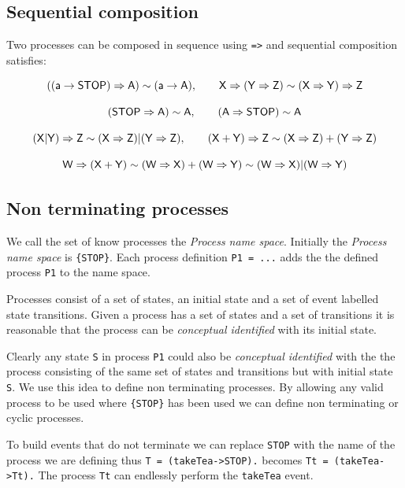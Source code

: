 \documentclass[]{article}
\begin{document}
\subsection{Sequential composition}

Two processes can be composed in sequence using \verb|=>|   and sequential composition satisfies:

\[\sf ((a->STOP)=>A) \sim (a->A),\qquad
X=>(Y=>Z) \sim (X=>Y)=>Z\]

\[\sf (STOP=>A) \sim A, \qquad (A=>STOP) \sim A \]

\[\sf (X|Y)=>Z \sim (X=>Z)| (Y=>Z), \qquad 
(X+Y)=>Z \sim (X=>Z)+ (Y=>Z)\] 

\[\sf W=>(X+Y) \sim (W=>X)+ (W=>Y) \sim (W=>X)| (W=>Y)\]





\subsection{Non terminating processes}
We call the set of know  processes  the  \emph{Process name space}.   Initially the  \emph{Process name space} is \verb${STOP}$.    Each process definition \verb$P1 = ...$ adds the the defined process \verb$P1$ to the name space.

Processes consist of a set of states, an initial state  and a set of event labelled state transitions. Given  a process has a set of states and a set of transitions it is reasonable that the process can be \emph{conceptual identified} with its initial state.


Clearly any state \verb$S$ in process \verb|P1| could also  be \emph{conceptual identified}  with the the process consisting of the same set of states and transitions but with initial state \verb$S$.  We use this idea to define non terminating processes.  By allowing any valid process to be used where \verb${STOP}$ has been used we can define non terminating or cyclic processes.


To build events that do not terminate we can replace \verb$STOP$ with the name of the process we are defining thus \verb$T = (takeTea->STOP).$ becomes \verb$Tt = (takeTea->Tt).$  The  process \verb$Tt$ can endlessly perform the \verb$takeTea$ event.
\end{document}
